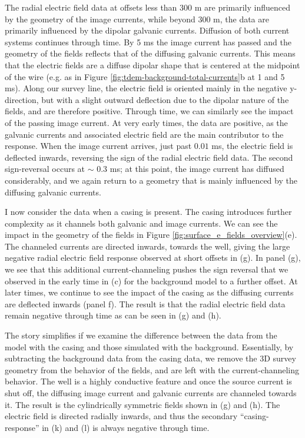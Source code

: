 The radial electric field data at offsets less than 300 m are primarily influenced by the geometry of the image currents, while beyond 300 m, the data are primarily influenced by the dipolar galvanic currents. Diffusion of both current systems continues through time. By 5 ms the image current has passed and the geometry of the fields reflects that of the diffusing galvanic currents. This means that the electric fields are a diffuse dipolar shape that is centered at the midpoint of the wire (e.g. as in Figure \ref{fig:tdem-background-total-currents}b at 1 and 5 ms). Along our survey line, the electric field is oriented mainly in the negative y-direction, but with a slight outward deflection due to the dipolar nature of the fields, and are therefore positive. Through time, we can similarly see the impact of the passing image current. At very early times, the data are positive, as the galvanic currents and associated electric field are the main contributor to the response. When the image current arrives, just past $0.01$ ms, the electric field is deflected inwards, reversing the sign of the radial electric field data. The second sign-reversal occurs at $\sim$ 0.3 ms; at this point, the image current has diffused considerably, and we again return to a geometry that is mainly influenced by the diffusing galvanic currents.

I now consider the data when a casing is present. The casing introduces further complexity as it channels both galvanic and image currents. We can see the impact in the geometry of the fields in Figure \ref{fig:surface_e_fields_overview}(e). The channeled currents are directed inwards, towards the well, giving the large negative radial electric field response observed at short offsets in (g). In panel (g), we see that this additional current-channeling pushes the sign reversal that we observed in the early time in (c) for the background model to a further offset. At later times, we continue to see the impact of the casing as the diffusing currents are deflected inwards (panel f). The result is that the radial electric field data remain negative through time as can be seen in (g) and (h).

The story simplifies if we examine the difference between the data from the model with the casing and those simulated with the background. Essentially, by subtracting the background data from the casing data, we remove the 3D survey geometry from the behavior of the fields, and are left with the current-channeling behavior. The well is a highly conductive feature and once the source current is shut off, the diffusing image current and galvanic currents are channeled towards it. The result is the cylindrically symmetric fields shown in (g) and (h). The electric field is directed radially inwards, and thus the secondary ``casing-response'' in (k) and (l) is always negative through time.

